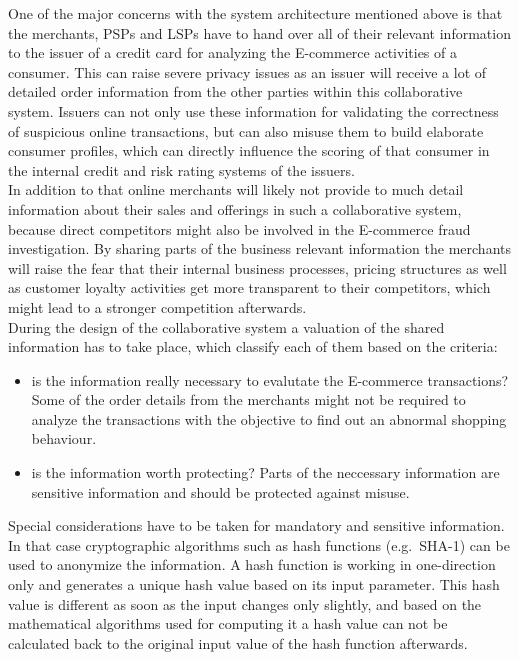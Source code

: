 One of the major concerns with the system architecture mentioned above is that the merchants, \gls{PSP}s and \gls{LSP}s have to hand over all of their relevant information to the issuer of a credit card for analyzing the \gls{E-commerce} activities of a consumer. This can raise severe privacy issues as an issuer will receive a lot of detailed order information from the other parties within this collaborative system. Issuers can not only use these information for validating the correctness of suspicious online transactions, but can also misuse them to build elaborate consumer profiles, which can directly influence the scoring of that consumer in the internal credit and risk rating systems of the issuers. \\

In addition to that online merchants will likely not provide to much detail information about their sales and offerings in such a collaborative system, because direct competitors might also be involved in the \gls{E-commerce} fraud investigation. By sharing parts of the business relevant information the merchants will raise the fear that their internal business processes, pricing structures as well as customer loyalty activities get more transparent to their competitors, which might lead to a stronger competition afterwards. \\

During the design of the collaborative system a valuation of the shared information has to take place, which classify each of them based on the criteria: \@

\begin{itemize}
	\item is the information really necessary to evalutate the \gls{E-commerce} transactions? Some of the order details from the merchants might not be required to analyze the transactions with the objective to find out an abnormal shopping behaviour.
	\item is the information worth protecting? Parts of the neccessary information are sensitive information and should be protected against misuse.
\end{itemize}

Special considerations have to be taken for mandatory and sensitive information. In that case cryptographic algorithms such as hash functions (e.g.\ \gls{SHA-1}) can be used to anonymize the information. A hash function is working in one-direction only and generates a unique hash value based on its input parameter. This hash value is different as soon as the input changes only slightly, and based on the mathematical algorithms used for computing it a hash value can not be calculated back to the original input value of the hash function afterwards. \\

